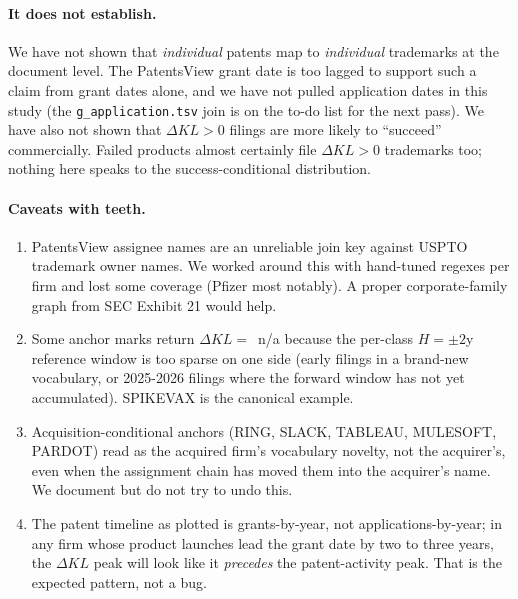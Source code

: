 \documentclass[11pt]{article}
\newcommand{\dKL}{\Delta KL}
\begin{document}
\paragraph{It does not establish.} We have not shown that
\emph{individual} patents map to \emph{individual} trademarks at the
document level. The PatentsView grant date is too lagged to support
such a claim from grant dates alone, and we have not pulled
application dates in this study (the \texttt{g\_application.tsv}
join is on the to-do list for the next pass). We have also not
shown that $\dKL > 0$ filings are more likely to ``succeed''
commercially. Failed products almost certainly file $\dKL > 0$
trademarks too; nothing here speaks to the success-conditional
distribution.

\paragraph{Caveats with teeth.}
\begin{enumerate}
\item PatentsView assignee names are an unreliable join key against
USPTO trademark owner names. We worked around this with hand-tuned
regexes per firm and lost some coverage (Pfizer most notably). A
proper corporate-family graph from SEC Exhibit 21 would help.
\item Some anchor marks return $\dKL =$~n/a because the per-class
$H=\pm 2$y reference window is too sparse on one side (early filings
in a brand-new vocabulary, or 2025-2026 filings where the forward
window has not yet accumulated). SPIKEVAX is the canonical example.
\item Acquisition-conditional anchors (RING, SLACK, TABLEAU,
MULESOFT, PARDOT) read as the acquired firm's vocabulary novelty,
not the acquirer's, even when the assignment chain has moved them
into the acquirer's name. We document but do not try to undo this.
\item The patent timeline as plotted is grants-by-year, not
applications-by-year; in any firm whose product launches lead the
grant date by two to three years, the $\dKL$ peak will look like it
\emph{precedes} the patent-activity peak. That is the
expected pattern, not a bug.
\end{enumerate}
\end{document}
